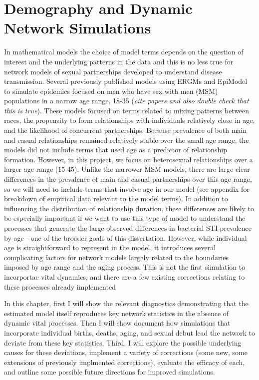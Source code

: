 \documentclass [11pt, proquest] {uwthesis}[2015/03/03]
\begin{document}
\chapter{Demography and Dynamic Network Simulations}\label{nets}

In mathematical models the choice of model terms depends on the question
of interest and the underlying patterns in the data and this is no less
true for network models of sexual partnerships developed to understand
disease transmission. Several previously published models using ERGMs
and EpiModel to simulate epidemics focused on men who have sex with men
(MSM) populations in a narrow age range, 18-35 (\emph{cite papers and
also double check that this is true}). These models focused on terms
related to mixing patterns between races, the propensity to form
relationships with individuals relatively close in age, and the
likelihood of concurrent partnerships. Because prevalence of both main
and casual relationships remained relatively stable over the small age
range, the models did not include terms that used age as a predictor of
relationship formation. However, in this project, we focus on
heterosexual relationships over a larger age range (15-45). Unlike the
narrower MSM models, there are large clear differences in the prevalence
of main and casual partnerships over this age range, so we will need to
include terms that involve age in our model (see appendix for breakdown
of empirical data relevant to the model terms). In addition to
influencing the distribution of relationship duration, these differences
are likely to be especially important if we want to use this type of
model to understand the processes that generate the large observed
differences in bacterial STI prevalence by age - one of the broader
goals of this dissertation. However, while individual age is
straightforward to represent in the model, it introduces several
complicating factors for network models largely related to the
boundaries imposed by age range and the aging process. This is not the
first simulation to incorportae vital dynamics, and there are a few
existing corrections relating to these processes already implemented

In this chapter, first I will show the relevant diagnostics
demonstrating that the estimated model itself reproduces key network
statistics in the absence of dynamic vital processes. Then I will show
document how simulations that incorporate individual births, deaths,
aging, and sexual debut lead the network to deviate from these key
statistics. Third, I will explore the possible underlying causes for
these deviations, implement a variety of corrections (some new, some
extensions of previously implmented corrections), evaluate the efficacy
of each, and outline some possible future directions for improved
simulations.
\end{document}
